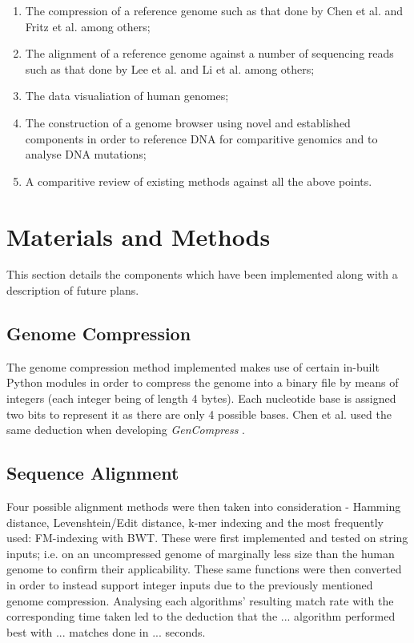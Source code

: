 \documentclass{csfyp}
\begin{document}
\begin{enumerate}[nolistsep]

   \item The compression of a reference genome such as that done by Chen et al. \cite{gencompress} and Fritz et al. \cite{refcompression} among others;

  \item The alignment of a reference genome against a number of sequencing reads such as that done by Lee et al. \cite{cgreads} and Li et al. \cite{bwtransform} among others;

  \item The data visualiation of human genomes;

  \item The construction of a genome browser using novel and established components in order to reference DNA for comparitive genomics and to analyse DNA mutations;  

  \item A comparitive review of existing methods against all the above points.

\end{enumerate}


\section{Materials and Methods}

This section details the components which have been implemented along with a description of future plans.

\subsection{Genome Compression}
The genome compression method implemented makes use of certain in-built Python modules in order to compress the genome into a binary file by means of integers (each integer being of length 4 bytes).  Each nucleotide base is assigned two bits to represent it as there are only 4 possible bases. Chen et al. used the same deduction when developing {\textit{GenCompress}} \cite{gencompress}.  

\subsection{Sequence Alignment}
Four possible alignment methods were then taken into consideration - Hamming distance, Levenshtein/Edit distance, k-mer indexing and the most frequently used: FM-indexing with BWT.  These were first implemented and tested on string inputs; i.e. on an uncompressed genome of marginally less size than the human genome to confirm their applicability.  These same functions were then converted in order to instead support integer inputs due to the previously mentioned genome compression.  Analysing each algorithms' resulting match rate with the corresponding time taken led to the deduction that the ... algorithm performed best with ... matches done in ... seconds.     
\end{document}
